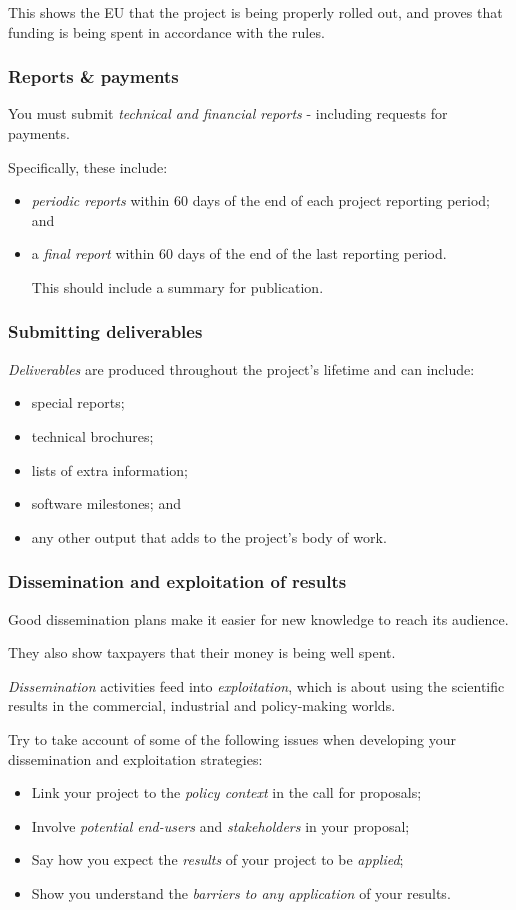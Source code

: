 \documentclass[oneside]{book}
\numberwithin{equation}{section}
\begin{document}
This shows the EU that the project is being properly rolled out, and proves that funding is being spent in accordance with the rules.

\subsubsection{Reports \& payments}
You must submit \textit{technical and financial reports} - including requests for payments.

Specifically, these include:
\begin{itemize}
    \item \textit{periodic reports} within 60 days of the end of each project reporting period; and
    \item a \textit{final report} within 60 days of the end of the last reporting period.
    
    This should include a summary for publication.
\end{itemize}

\subsubsection{Submitting deliverables}
\textit{Deliverables} are produced throughout the project's lifetime and can include:
\begin{itemize}
    \item special reports;
    \item technical brochures;
    \item lists of extra information;
    \item software milestones; and
    \item any other output that adds to the project's body of work.    
\end{itemize}

\subsubsection{Dissemination and exploitation of results}
Good dissemination plans make it easier for new knowledge to reach its audience.

They also show taxpayers that their money is being well spent.

%
\textit{Dissemination} activities feed into \textit{exploitation}, which is about using the scientific results in the commercial, industrial and policy-making worlds.

%
Try to take account of some of the following issues when developing your dissemination and exploitation strategies:
\begin{itemize}
    \item Link your project to the \textit{policy context} in the call for proposals;
    \item Involve \textit{potential end-users} and \textit{stakeholders} in your proposal;
    \item Say how you expect the \textit{results} of your project to be \textit{applied};
    \item Show you understand the \textit{barriers to any application} of your results.    
\end{itemize}
\end{document}
